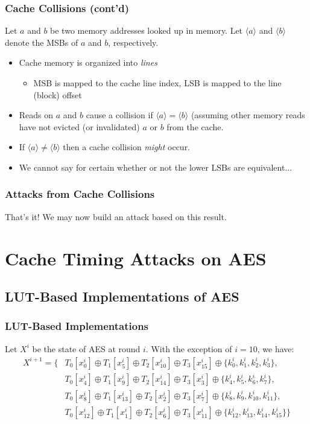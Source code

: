 \documentclass[9pt,handout]{beamer}
\begin{document}
\begin{frame}
	\frametitle{Cache Collisions (cont'd)}
	Let $a$ and $b$ be two memory addresses looked up in memory. Let $\langle a \rangle$ and $\langle b \rangle$ 
	denote the MSBs of $a$ and $b$, respectively. 
	\begin{itemize}
		\item Cache memory is organized into \emph{lines}
		\begin{itemize}
			\item MSB is mapped to the cache line index, LSB is mapped to the line (block) offset
		\end{itemize}
		\item Reads on $a$ and $b$ cause a collision if $\langle a \rangle = \langle b \rangle$ (assuming other memory reads
		have not evicted (or invalidated) $a$ or $b$ from the cache. 
		\item If $\langle a \rangle \not= \langle b \rangle$ then a cache collision \emph{might} occur.
		\item We cannot say for certain whether or not the lower LSBs are equivalent...
	\end{itemize}
\end{frame}

\begin{frame}
	\frametitle{Attacks from Cache Collisions}
	\begin{center}
	That's it! We may now build an attack based on this result.
	\end{center}
\end{frame}

\section{Cache Timing Attacks on AES}
\subsection{LUT-Based Implementations of AES}
\begin{frame}
	\frametitle{LUT-Based Implementations}
	Let $X^i$ be the state of AES at round $i$. With the exception of $i = 10$, we have:
\begin{align*}
X^{i+1} = \{ & T_0[x_0^i] \oplus T_1[x_5^i] \oplus T_2[x_{10}^i] \oplus T_3[x_{15}^i] \oplus \{k_0^i, k_1^i, k_2^i, k_3^i\}, \\
& T_0[x_4^i] \oplus T_1[x_{9}^i] \oplus T_2[x_{14}^i] \oplus T_3[x_3^i] \oplus \{k_4^i, k_5^i, k_6^i, k_7^i\}, \\
& T_0[x_8^i] \oplus T_1[x_{13}^i] \oplus T_2[x_2^i] \oplus T_3[x_7^i] \oplus \{k_8^i, k_9^i, k_{10}^i, k_{11}^i\}, \\
& T_0[x_{12}^i] \oplus T_1[x_1^i] \oplus T_2[x_6^i] \oplus T_3[x_{11}^i] \oplus \{k_{12}^i, k_{13}^i, k_{14}^i, k_{15}^i\}\}
\end{align*}
\end{frame}
\end{document}
